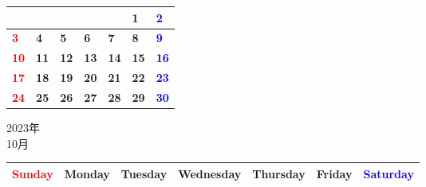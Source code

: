 \documentclass[a4paper,landscape]{jsarticle}
\newcommand{\dig}{\hspace{29mm}}
\newcommand{\tdig}{\hspace{27mm}}
\newcommand{\LBF}{\LARGE\textbf}
\begin{document}
\begingroup
\renewcommand{\arraystretch}{4}
\begin{tabular}{|p{32mm}|p{32mm}|p{32mm}|p{32mm}|p{32mm}|p{32mm}|p{32mm}|}
\hline
&&&&&\raisebox{30pt} {\dig\LBF{1}}&\raisebox{30pt} {\dig\textcolor{blue}{\LBF{2}}}\\
\hline
\raisebox{30pt} {\dig\textcolor{red}{\LBF{3}}}&\raisebox{30pt} {\dig\LBF{4}}&\raisebox{30pt} {\dig\LBF{5}}&\raisebox{30pt} {\dig\LBF{6}}&\raisebox{30pt} {\dig\LBF{7}}&\raisebox{30pt} {\dig\LBF{8}}&\raisebox{30pt} {\dig\textcolor{blue}{\LBF{9}}}\\
\hline
\raisebox{30pt} {\tdig\textcolor{red}{\LBF{10}}}&\raisebox{30pt} {\tdig\LBF{11}}&\raisebox{30pt} {\tdig\LBF{12}}&\raisebox{30pt} {\tdig\LBF{13}}&\raisebox{30pt} {\tdig\LBF{14}}&\raisebox{30pt} {\tdig\LBF{15}}&\raisebox{30pt} {\tdig\textcolor{blue}{\LBF{16}}}\\
\hline
\raisebox{30pt} {\tdig\textcolor{red}{\LBF{17}}}&\raisebox{30pt} {\tdig\LBF{18}}&\raisebox{30pt} {\tdig\LBF{19}}&\raisebox{30pt} {\tdig\LBF{20}}&\raisebox{30pt} {\tdig\LBF{21}}&\raisebox{30pt} {\tdig\LBF{22}}&\raisebox{30pt} {\tdig\textcolor{blue}{\LBF{23}}}\\
\hline
\raisebox{30pt} {\tdig\textcolor{red}{\LBF{24}}}&\raisebox{30pt} {\tdig\LBF{25}}&\raisebox{30pt} {\tdig\LBF{26}}&\raisebox{30pt} {\tdig\LBF{27}}&\raisebox{30pt} {\tdig\LBF{28}}&\raisebox{30pt} {\tdig\LBF{29}}&\raisebox{30pt} {\tdig\textcolor{blue}{\LBF{30}}}\\
\hline
\end{tabular}
\endgroup

\newpage

\begin{center}
	\LARGE 2023年\\
	\LARGE 10月
\end{center}

\begingroup
\renewcommand{\arraystretch}{1.4}
\begin{tabular}{|>{\centering\arraybackslash}p{32mm}|>{\centering\arraybackslash}p{32mm}|>{\centering\arraybackslash}p{32mm}|>{\centering\arraybackslash}p{32mm}|>{\centering\arraybackslash}p{32mm}|>{\centering\arraybackslash}p{32mm}|>{\centering\arraybackslash}p{32mm}|}
\hline
\textcolor{red}{\large Sunday}&\large Monday&\large Tuesday&\large Wednesday&\large Thursday&\large Friday&\textcolor{blue}{\large Saturday}\\
\hline
\end{tabular}
\endgroup
\end{document}
